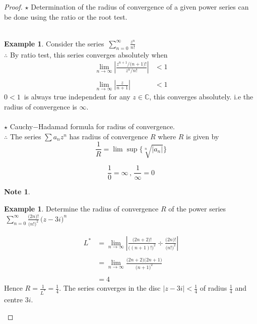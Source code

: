 \documentclass[11pt,a4paper]{article}
\theoremstyle{definition}
\newtheorem{example}[thm]{Example}
\newtheorem{note}[thm]{Note}
\begin{document}
\begin{proof}
$\star$ Determination of the radius of convergence of a given power series can be done using the ratio or the root test.\\\\




\begin{example}
Consider the series $\,\displaystyle{\sum^{\infty}_{n = 0} \frac{z^n}{n!}}$\\

$\therefore$ By ratio test, this series converges absolutely when
\begin{align*}
\lim\limits_{n\rightarrow \infty} \left|\frac{z^{n+1}\big/\big(n+1\big)!}{z^n\big/n!}\right|& < 1\\\\
\lim\limits_{n \rightarrow\infty} \left|\frac{z}{n+1}\right| & < 1
\end{align*}
$0 < 1 \,$ is always true independent for any $z\in \mathbb{C}$, this converges absolutely.
i.e the radius of convergence is $\infty$.\\\\





$\star$ Cauchy$-$Hadamad formula for radius of convergence.\\
$\therefore$ The series $\displaystyle{\sum a_n z^n}$ has radius of convergence $R$ where $R$ is given by 
$$\frac{1}{R} = \lim \sup \Big\{\sqrt[n]{\left|a_n\right|}\Big\}$$


$$\frac{1}{0} = \infty \,, \, \frac{1}{\infty}= 0$$
\end{example}

\begin{note}
\end{note}



\begin{example}
Determine the radius of convergence $R$ of the power series $\, \displaystyle{\sum^{\infty}_{n = 0} \frac{\big(2n\big)!}{\big(n!\big)^2}\,\big(z - 3i\big)^n}$

\begin{align*}
L^* & = \lim\limits_{n\rightarrow \infty} \left|\frac{\big(2n + 2\big)!}{\big((n+1)!\big)^2}\div \frac{\big(2n)!}{\big(n!\big)^2}\right|\\\\
& = \lim\limits_{n\rightarrow \infty} \frac{\big(2n + 2\big)\big(2n+1\big)}{\big(n + 1\big)^2}\\\\
& = 4
\end{align*}
Hence $R = \frac{1}{L^*} = \frac{1}{4}$. The series converges in the disc $\left|z - 3i\right|< \frac{1}{4}$ of radius $\frac{1}{4}$ and centre $3i$.
\end{example}
\end{proof}
\end{document}
